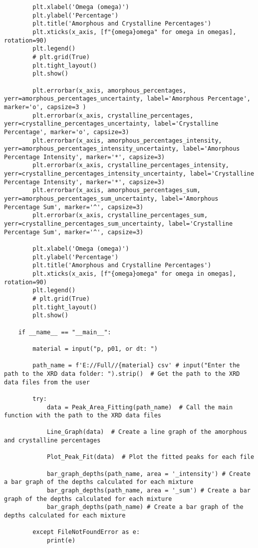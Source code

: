 \begin{lstlisting}
        plt.xlabel('Omega (omega)')
        plt.ylabel('Percentage')
        plt.title('Amorphous and Crystalline Percentages')
        plt.xticks(x_axis, [f"{omega}omega" for omega in omegas], rotation=90)
        plt.legend()
        # plt.grid(True)
        plt.tight_layout()
        plt.show()

        plt.errorbar(x_axis, amorphous_percentages, yerr=amorphous_percentages_uncertainty, label='Amorphous Percentage', marker='o', capsize=3 )
        plt.errorbar(x_axis, crystalline_percentages, yerr=crystalline_percentages_uncertainty, label='Crystalline Percentage', marker='o', capsize=3)
        plt.errorbar(x_axis, amorphous_percentages_intensity, yerr=amorphous_percentages_intensity_uncertainty, label='Amorphous Percentage Intensity', marker='*', capsize=3)
        plt.errorbar(x_axis, crystalline_percentages_intensity, yerr=crystalline_percentages_intensity_uncertainty, label='Crystalline Percentage Intensity', marker='*', capsize=3)
        plt.errorbar(x_axis, amorphous_percentages_sum, yerr=amorphous_percentages_sum_uncertainty, label='Amorphous Percentage Sum', marker='^', capsize=3)
        plt.errorbar(x_axis, crystalline_percentages_sum, yerr=crystalline_percentages_sum_uncertainty, label='Crystalline Percentage Sum', marker='^', capsize=3)

        plt.xlabel('Omega (omega)')
        plt.ylabel('Percentage')
        plt.title('Amorphous and Crystalline Percentages')
        plt.xticks(x_axis, [f"{omega}omega" for omega in omegas], rotation=90)
        plt.legend()
        # plt.grid(True)
        plt.tight_layout()
        plt.show()

    if __name__ == "__main__":

        material = input("p, p01, or dt: ")

        path_name = f'E://Full//{material} csv' # input("Enter the path to the XRD data folder: ").strip()  # Get the path to the XRD data files from the user

        try:
            data = Peak_Area_Fitting(path_name)  # Call the main function with the path to the XRD data files

            Line_Graph(data)  # Create a line graph of the amorphous and crystalline percentages

            Plot_Peak_Fit(data)  # Plot the fitted peaks for each file

            bar_graph_depths(path_name, area = '_intensity') # Create a bar graph of the depths calculated for each mixture
            bar_graph_depths(path_name, area = '_sum') # Create a bar graph of the depths calculated for each mixture
            bar_graph_depths(path_name) # Create a bar graph of the depths calculated for each mixture
        
        except FileNotFoundError as e:
            print(e)
\end{lstlisting}
